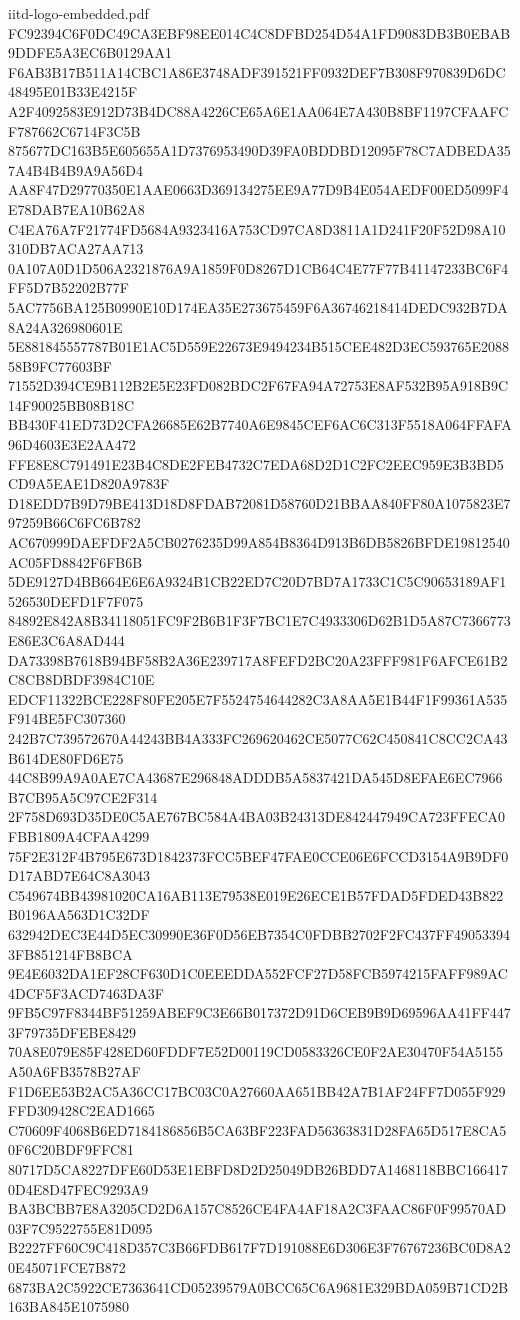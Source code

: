 \begin{filecontents*}[overwrite]{iitd-logo-embedded.pdf}
FC92394C6F0DC49CA3EBF98EE014C4C8DFBD254D54A1FD9083DB3B0EBAB9DDFE5A3EC6B0129AA1
F6AB3B17B511A14CBC1A86E3748ADF391521FF0932DEF7B308F970839D6DC48495E01B33E4215F
A2F4092583E912D73B4DC88A4226CE65A6E1AA064E7A430B8BF1197CFAAFCF787662C6714F3C5B
875677DC163B5E605655A1D7376953490D39FA0BDDBD12095F78C7ADBEDA357A4B4B4B9A9A56D4
AA8F47D29770350E1AAE0663D369134275EE9A77D9B4E054AEDF00ED5099F4E78DAB7EA10B62A8
C4EA76A7F21774FD5684A9323416A753CD97CA8D3811A1D241F20F52D98A10310DB7ACA27AA713
0A107A0D1D506A2321876A9A1859F0D8267D1CB64C4E77F77B41147233BC6F4FF5D7B52202B77F
5AC7756BA125B0990E10D174EA35E273675459F6A36746218414DEDC932B7DA8A24A326980601E
5E881845557787B01E1AC5D559E22673E9494234B515CEE482D3EC593765E208858B9FC77603BF
71552D394CE9B112B2E5E23FD082BDC2F67FA94A72753E8AF532B95A918B9C14F90025BB08B18C
BB430F41ED73D2CFA26685E62B7740A6E9845CEF6AC6C313F5518A064FFAFA96D4603E3E2AA472
FFE8E8C791491E23B4C8DE2FEB4732C7EDA68D2D1C2FC2EEC959E3B3BD5CD9A5EAE1D820A9783F
D18EDD7B9D79BE413D18D8FDAB72081D58760D21BBAA840FF80A1075823E797259B66C6FC6B782
AC670999DAEFDF2A5CB0276235D99A854B8364D913B6DB5826BFDE19812540AC05FD8842F6FB6B
5DE9127D4BB664E6E6A9324B1CB22ED7C20D7BD7A1733C1C5C90653189AF1526530DEFD1F7F075
84892E842A8B34118051FC9F2B6B1F3F7BC1E7C4933306D62B1D5A87C7366773E86E3C6A8AD444
DA73398B7618B94BF58B2A36E239717A8FEFD2BC20A23FFF981F6AFCE61B2C8CB8DBDF3984C10E
EDCF11322BCE228F80FE205E7F5524754644282C3A8AA5E1B44F1F99361A535F914BE5FC307360
242B7C739572670A44243BB4A333FC269620462CE5077C62C450841C8CC2CA43B614DE80FD6E75
44C8B99A9A0AE7CA43687E296848ADDDB5A5837421DA545D8EFAE6EC7966B7CB95A5C97CE2F314
2F758D693D35DE0C5AE767BC584A4BA03B24313DE842447949CA723FFECA0FBB1809A4CFAA4299
75F2E312F4B795E673D1842373FCC5BEF47FAE0CCE06E6FCCD3154A9B9DF0D17ABD7E64C8A3043
C549674BB43981020CA16AB113E79538E019E26ECE1B57FDAD5FDED43B822B0196AA563D1C32DF
632942DEC3E44D5EC30990E36F0D56EB7354C0FDBB2702F2FC437FF490533943FB851214FB8BCA
9E4E6032DA1EF28CF630D1C0EEEDDA552FCF27D58FCB5974215FAFF989AC4DCF5F3ACD7463DA3F
9FB5C97F8344BF51259ABEF9C3E66B017372D91D6CEB9B9D69596AA41FF4473F79735DFEBE8429
70A8E079E85F428ED60FDDF7E52D00119CD0583326CE0F2AE30470F54A5155A50A6FB3578B27AF
F1D6EE53B2AC5A36CC17BC03C0A27660AA651BB42A7B1AF24FF7D055F929FFD309428C2EAD1665
C70609F4068B6ED7184186856B5CA63BF223FAD56363831D28FA65D517E8CA50F6C20BDF9FFC81
80717D5CA8227DFE60D53E1EBFD8D2D25049DB26BDD7A1468118BBC1664170D4E8D47FEC9293A9
BA3BCBB7E8A3205CD2D6A157C8526CE4FA4AF18A2C3FAAC86F0F99570AD03F7C9522755E81D095
B2227FF60C9C418D357C3B66FDB617F7D191088E6D306E3F76767236BC0D8A20E45071FCE7B872
6873BA2C5922CE7363641CD05239579A0BCC65C6A9681E329BDA059B71CD2B163BA845E1075980

\end{filecontents*}
